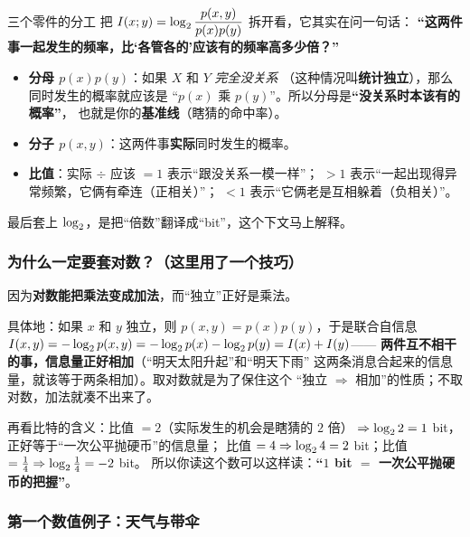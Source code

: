 \begin{idea}{三个零件的分工}
把 $I\!\left(x;y\right)=\log_{2}\dfrac{p(x,y)}{p(x)p(y)}$ 拆开看，它其实在问一句话：
\textbf{“这两件事一起发生的频率，比‘各管各的’应该有的频率高多少倍？”}
\begin{itemize}[leftmargin=1.4em,itemsep=1pt,topsep=1pt]
  \item \textbf{分母 $p(x)p(y)$}：如果 $X$ 和 $Y$ \emph{完全没关系}
        （这种情况叫\textbf{统计独立}），那么同时发生的概率就应该是
        “$p(x)$ 乘 $p(y)$”。所以分母是\textbf{“没关系时本该有的概率”}，
        也就是你的\textbf{基准线}（瞎猜的命中率）。
  \item \textbf{分子 $p(x,y)$}：这两件事\textbf{实际}同时发生的概率。
  \item \textbf{比值}：实际 $\div$ 应该 $=1$ 表示“跟没关系一模一样”；
        $>1$ 表示“一起出现得异常频繁，它俩有牵连（正相关）”；
        $<1$ 表示“它俩老是互相躲着（负相关）”。
\end{itemize}
最后套上 $\log_{2}$，是把“倍数”翻译成“bit”，这个下文马上解释。
\end{idea}

\subsubsection{为什么一定要套对数？（这里用了一个技巧）}

因为\textbf{对数能把乘法变成加法}，而“独立”正好是乘法。

具体地：如果 $x$ 和 $y$ 独立，则 $p(x,y)=p(x)p(y)$，于是联合自信息
$I(x,y)=-\log_{2} p(x,y)=-\log_{2} p(x)-\log_{2} p(y)=I(x)+I(y)$——
\textbf{两件互不相干的事，信息量正好相加}（“明天太阳升起”和“明天下雨”
这两条消息合起来的信息量，就该等于两条相加）。取对数就是为了保住这个
“独立 $\Rightarrow$ 相加”的性质；不取对数，加法就凑不出来了。

再看比特的含义：比值 $=2$（实际发生的机会是瞎猜的 $2$ 倍）
$\Rightarrow\log_{2} 2=1$ bit，正好等于“一次公平抛硬币”的信息量；
比值 $=4\Rightarrow\log_{2} 4=2$ bit；比值 $=\frac14\Rightarrow\log_{2}\frac14=-2$ bit。
所以你读这个数可以这样读：\textbf{“$1$ bit $=$ 一次公平抛硬币的把握”}。

\subsubsection{第一个数值例子：天气与带伞}

